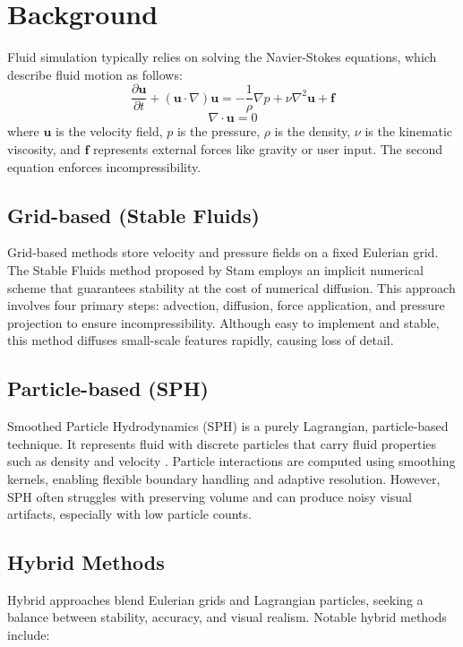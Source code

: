 \section{Background}
Fluid simulation typically relies on solving the Navier-Stokes equations, which describe fluid motion as follows:
\begin{equation}
\frac{\partial \mathbf{u}}{\partial t} + (\mathbf{u}\cdot\nabla)\mathbf{u} = -\frac{1}{\rho}\nabla p + \nu\nabla^2\mathbf{u} + \mathbf{f}
\end{equation}
\begin{equation}
\nabla \cdot \mathbf{u} = 0
\end{equation}
where $\mathbf{u}$ is the velocity field, $p$ is the pressure, $\rho$ is the density, $\nu$ is the kinematic viscosity, and $\mathbf{f}$ represents external forces like gravity or user input. The second equation enforces incompressibility.

\subsection{Grid-based (Stable Fluids)}
Grid-based methods store velocity and pressure fields on a fixed Eulerian grid. The Stable Fluids method proposed by Stam \citet{Stam 1999} employs an implicit numerical scheme that guarantees stability at the cost of numerical diffusion. This approach involves four primary steps: advection, diffusion, force application, and pressure projection to ensure incompressibility. Although easy to implement and stable, this method diffuses small-scale features rapidly, causing loss of detail.

\subsection{Particle-based (SPH)}
Smoothed Particle Hydrodynamics (SPH) is a purely Lagrangian, particle-based technique. It represents fluid with discrete particles that carry fluid properties such as density and velocity \cite{Monaghan1992SPH}. Particle interactions are computed using smoothing kernels, enabling flexible boundary handling and adaptive resolution. However, SPH often struggles with preserving volume and can produce noisy visual artifacts, especially with low particle counts.

\subsection{Hybrid Methods}
Hybrid approaches blend Eulerian grids and Lagrangian particles, seeking a balance between stability, accuracy, and visual realism. Notable hybrid methods include:


